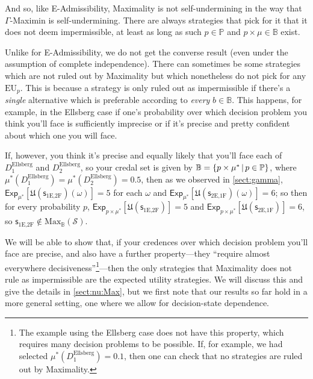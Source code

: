 \documentclass[a4paper,final]{article}
\renewcommand\P{\mathbb{P}} %
\newcommand\Exp{\mathsf{Exp}}
\newcommand\EU{\mathrm{EU}}
\newcommand\U{\mathfrak{U}} %
\newcommand\Maximality{\mathrm{Max}}
\renewcommand\S{\mathcal{S}}
\newcommand\s{\mathsf{s}}
\newcommand{\IB}{\mathbb{B}}
\newcommand{\IP}{\P}
\renewcommand{\color}[1]{}
\newenvironment{colored}[1]{\leavevmode\color{#1}}{}
\newcommand{\Strategies}{\S}
\newcommand\SetDelimiter[1][]{
	\nonscript\,#1\vert \allowbreak \nonscript\,\mathopen{}}
\providecommand\given{\SetDelimiter}
\newenvironment{CCM rewritten}
{\begingroup\color{blue}} %
{\endgroup}              %
\begin{document}
And so, like E-Admissibility, Maximality is not self-undermining in the way that $\Gamma$-Maximin is self-undermining. There are always strategies that pick for it that it does not deem impermissible, %
	at least as long as such $p\in\IP$ and $p\times\mu\in\IB$ exist.

Unlike for E-Admissibility, we do not get the converse result (even under the assumption of complete independence). There can sometimes be some strategies which are not ruled out by Maximality but which nonetheless do not pick for any $\EU_p$. This is because a strategy is only ruled out as impermissible if there's a \emph{single} alternative which is preferable according to \emph{every} $b\in \IB$. 
This happens, for example, in the Ellsberg case if one's probability over which decision problem you think you'll face is sufficiently imprecise or if it's precise and pretty confident about which one you will face. 

If, however, you think it's precise and equally likely that you'll face each of $D^{\mathrm{Ellsberg}}_1$ and $D^{\mathrm{Ellsberg}}_2$, so your credal set is given by $\IB=\{p\times\mu^*\given p\in\IP\}$, where $\mu^*(D^{\mathrm{Ellsberg}}_1)=\mu^*(D^{\mathrm{Ellsberg}}_2)=0.5$, then as we observed in \cref{sect:gamma}, $\Exp_{\mu^*}[\U(\s_{\text{1E,2F}})(\omega)]=5$ for each $\omega$ and $\Exp_{\mu^*}[\U(\s_{\text{2E,1F}})(\omega)]=6$; so then for every probability $p$, $\Exp_{p\times\mu^*}[\U(\s_{\text{1E,2F}})]=5$ and $\Exp_{p\times\mu^*}[\U(\s_{\text{2E,1F}})]=6$, so  $\s_{\text{1E,2F}}\notin\Maximality_\IB(\Strategies)$. 

We will be able to show that, if your credences over which decision problem you'll face are precise, and also have a further property---they ``require almost everywhere decisiveness''\footnote{The example using the Ellsberg case does not have this property, which requires many decision problems to be possible. If, for example, we had selected $\mu^*(D^{\mathrm{Ellsberg}}_1)=0.1$, then one can check that no strategies are ruled out by Maximality.}---then %
the only strategies that Maximality does not rule as impermissible are the expected utility strategies. We will discuss this and give the details in \cref{sect:nu:Max}, but we first note that our results so far hold in a more general setting, one where we allow for decision-state dependence. 
\end{document}
